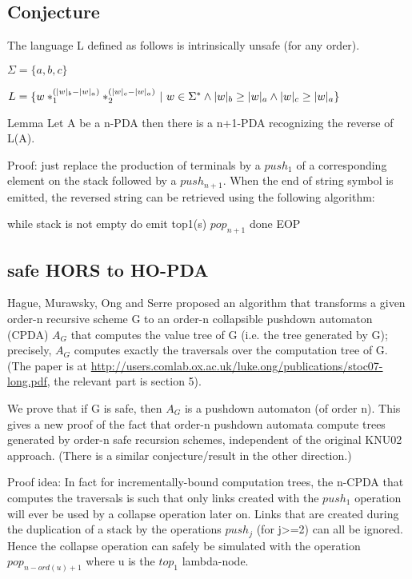 \documentclass{article}
\begin{document}
\subsection{Conjecture}
The language L defined as follows is intrinsically unsafe (for any order).

$\Sigma = \{ a, b, c \}$

$L = \{ w *_1^{(|w|_b - |w|_a)} *_2^{(|w|_c - |w|_a)} \ | \
   w \in \Sigma^* \wedge |w|_b \geq |w|_a \wedge |w|_c \geq |w|_a \}$




Lemma Let A be a n-PDA then there is a n+1-PDA recognizing
the reverse of L(A).

Proof: just replace the production of terminals by a $push_1$
of a corresponding element on the stack followed by a $push_{n+1}$.
When the end of string symbol is emitted, the reversed string can be
retrieved using the following algorithm:

    while stack is not empty do
       emit top1(s)
       $pop_{n+1}$
    done
EOP





\subsection{safe HORS to HO-PDA}

Hague, Murawsky, Ong and Serre proposed an algorithm that transforms a
given order-n recursive scheme G to an order-n collapsible pushdown
 automaton (CPDA) $A_G$ that computes the value tree of G (i.e. the tree
 generated by G); precisely, $A_G$ computes exactly the traversals over the
 computation tree of G. (The paper is at
\url{http://users.comlab.ox.ac.uk/luke.ong/publications/stoc07-long.pdf},
the relevant part is section 5).

We prove that if G is safe, then $A_G$ is a pushdown automaton
 (of order n). This gives a new proof of the fact that order-n pushdown automata compute
 trees generated by order-n safe recursion schemes, independent of the
 original KNU02 approach. (There is a similar conjecture/result in the
 other direction.)


Proof idea:
In fact for incrementally-bound computation trees,
the n-CPDA that computes the traversals is  such that only links created with the $push_1$
operation will ever be used by a collapse operation later on.
Links that are created during the duplication of a stack by the
operations $push_j$ (for j>=2) can all be ignored. Hence the
collapse operation can safely be simulated with the operation
$pop_{n-ord(u)+1}$ where u is the $top_1$ lambda-node.
\end{document}

